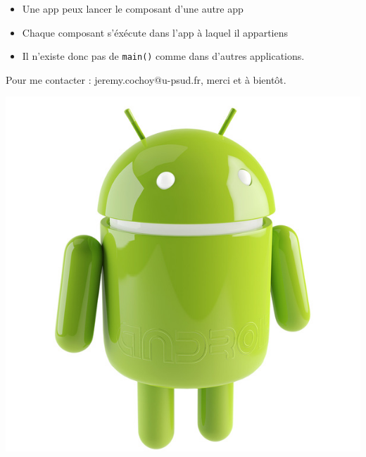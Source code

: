 \documentclass{beamer}
\begin{document}
\begin{frame}
\begin{itemize}
\item Une app peux lancer le composant d'une autre app
\item Chaque composant s'éxécute dans l'app à laquel il appartiens
\item Il n'existe donc pas de \verb!main()! comme dans d'autres applications.
\end{itemize}

\end{frame}

\begin{frame}
\begin{center}
Pour me contacter : jeremy.cochoy@u-psud.fr, merci et à bientôt.

\includegraphics[scale=0.18]{android.jpg}
\end{center}
\end{frame}
\end{document}
